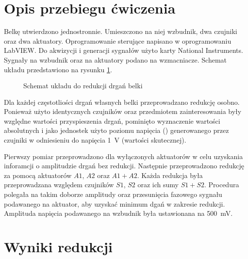 \documentclass[polish,a4paper,11pt]{mwart}
\let\Oldsection\section
\renewcommand{\section}{\FloatBarrier\Oldsection}
\begin{document}
  \section{Opis przebiegu ćwiczenia}

  Belkę utwierdzono jednostronnie. Umieszczono na niej wzbudnik, dwa czujniki
  oraz dwa aktuatory. Oprogramowanie sterujące napisano w oprogramowaniu
  LabVIEW\textregistered. Do akwizycji i generacji sygnałów użyto karty
  National Instruments\textregistered. Sygnały na wzbudnik oraz na aktuatory
  podano na wzmacniacze. Schemat układu przedstawiono na rysunku \ref{fig:beam}.

  \begin{figure}[!tbh]
    \centering
    
    \caption{Schemat układu do redukcji drgań belki}
    \label{fig:beam}
  \end{figure}

  Dla każdej częstotliości drgań własnych belki przeprowadzano redukcję osobno.
  Ponieważ użyto identycznych czujników oraz przedmiotem zainteresowania były
  względne wartości przyspieszenia drgań, pominięto wyznaczenie wartości
  absolutnych i jako jednostek użyto poziomu napięcia (\si{\decibelV})
  generowanego przez czujniki w odniesieniu do napięcia \SI{1}{\volt} (wartości
  skutecznej). 

  Pierwszy pomiar przeprowadzono dla wyłączonych aktuatorów w celu uzyskania
  inforamcji o amplitudzie drgań bez redukcji. Następnie przeprowadzono
  redukcję za pomocą aktuatorów $A1$, $A2$ oraz $A1+A2$. Każda redukcja była
  przeprowadzana względem czujników $S1$, $S2$ oraz ich sumy $S1+S2$.
  Procedura polegała na takim doborze amplitudy oraz
  przesunięcia fazowego sygnału podawanego na aktuator, aby uzyskać minimum
  dgań w zakresie redukcji. Amplituda napięcia podawanego na wzbudnik była
  ustawionana na \SI{500}{\milli\volt}.

  \section{Wyniki redukcji}
  
\end{document}
